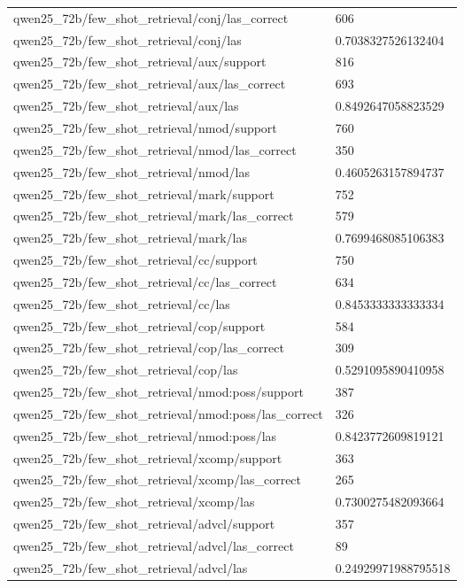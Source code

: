 \begin{tabular}{ll}
qwen25\_72b/few\_shot\_retrieval/conj/las\_correct & 606 \\
qwen25\_72b/few\_shot\_retrieval/conj/las & 0.7038327526132404 \\
qwen25\_72b/few\_shot\_retrieval/aux/support & 816 \\
qwen25\_72b/few\_shot\_retrieval/aux/las\_correct & 693 \\
qwen25\_72b/few\_shot\_retrieval/aux/las & 0.8492647058823529 \\
qwen25\_72b/few\_shot\_retrieval/nmod/support & 760 \\
qwen25\_72b/few\_shot\_retrieval/nmod/las\_correct & 350 \\
qwen25\_72b/few\_shot\_retrieval/nmod/las & 0.4605263157894737 \\
qwen25\_72b/few\_shot\_retrieval/mark/support & 752 \\
qwen25\_72b/few\_shot\_retrieval/mark/las\_correct & 579 \\
qwen25\_72b/few\_shot\_retrieval/mark/las & 0.7699468085106383 \\
qwen25\_72b/few\_shot\_retrieval/cc/support & 750 \\
qwen25\_72b/few\_shot\_retrieval/cc/las\_correct & 634 \\
qwen25\_72b/few\_shot\_retrieval/cc/las & 0.8453333333333334 \\
qwen25\_72b/few\_shot\_retrieval/cop/support & 584 \\
qwen25\_72b/few\_shot\_retrieval/cop/las\_correct & 309 \\
qwen25\_72b/few\_shot\_retrieval/cop/las & 0.5291095890410958 \\
qwen25\_72b/few\_shot\_retrieval/nmod:poss/support & 387 \\
qwen25\_72b/few\_shot\_retrieval/nmod:poss/las\_correct & 326 \\
qwen25\_72b/few\_shot\_retrieval/nmod:poss/las & 0.8423772609819121 \\
qwen25\_72b/few\_shot\_retrieval/xcomp/support & 363 \\
qwen25\_72b/few\_shot\_retrieval/xcomp/las\_correct & 265 \\
qwen25\_72b/few\_shot\_retrieval/xcomp/las & 0.7300275482093664 \\
qwen25\_72b/few\_shot\_retrieval/advcl/support & 357 \\
qwen25\_72b/few\_shot\_retrieval/advcl/las\_correct & 89 \\
qwen25\_72b/few\_shot\_retrieval/advcl/las & 0.24929971988795518 \\

\end{tabular}
